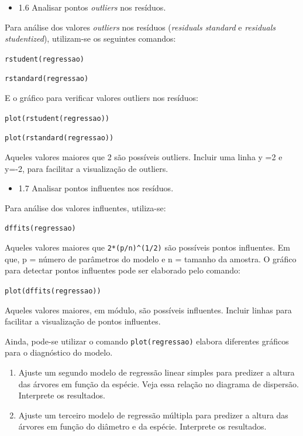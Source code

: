 \documentclass[12pt,brazil,oneside]{book}
\providecommand{\tightlist}{%
  \setlength{\itemsep}{0pt}\setlength{\parskip}{0pt}}
\begin{document}
\begin{itemize}
\tightlist
\item
  1.6 Analisar pontos \emph{outliers} nos resíduos.
\end{itemize}

Para análise dos valores \emph{outliers} nos resíduos (\emph{residuals
standard} e \emph{residuals studentized}), utilizam-se os seguintes
comandos:

\texttt{rstudent(regressao)}

\texttt{rstandard(regressao)}

E o gráfico para verificar valores outliers nos resíduos:

\texttt{plot(rstudent(regressao))}

\texttt{plot(rstandard(regressao))}

Aqueles valores maiores que \textbar{}2\textbar{} são possíveis
outliers. Incluir uma linha y =2 e y=-2, para facilitar a visualização
de outliers.

\begin{itemize}
\tightlist
\item
  1.7 Analisar pontos influentes nos resíduos.
\end{itemize}

Para análise dos valores influentes, utiliza-se:

\texttt{dffits(regressao)}

Aqueles valores maiores que \texttt{2*(p/n)\^{}(1/2)} são possíveis
pontos influentes. Em que, p = número de parâmetros do modelo e n =
tamanho da amostra. O gráfico para detectar pontos influentes pode ser
elaborado pelo comando:

\texttt{plot(dffits(regressao))}

Aqueles valores maiores, em módulo, são possíveis influentes. Incluir
linhas para facilitar a visualização de pontos influentes.

Ainda, pode-se utilizar o comando \texttt{plot(regressao)} elabora
diferentes gráficos para o diagnóstico do modelo.

\begin{enumerate}
\def\labelenumi{\arabic{enumi})}
\setcounter{enumi}{1}
\item
  Ajuste um segundo modelo de regressão linear simples para predizer a
  altura das árvores em função da espécie. Veja essa relação no diagrama
  de dispersão. Interprete os resultados.
\item
  Ajuste um terceiro modelo de regressão múltipla para predizer a altura
  das árvores em função do diâmetro e da espécie. Interprete os
  resultados.
\end{enumerate}
\end{document}
